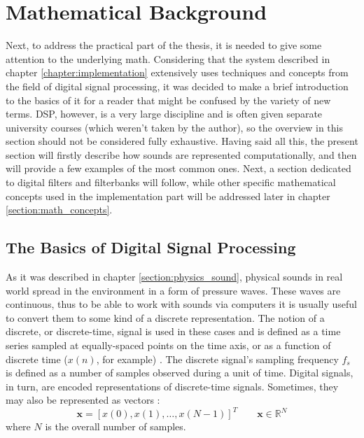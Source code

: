 \section{Mathematical Background}\label{chapter:math}

Next, to address the practical part of the thesis, it is needed to give some attention to the underlying math. Considering that the system described in chapter \ref{chapter:implementation} extensively uses techniques and concepts from the field of digital signal processing, it was decided to make a brief introduction to the basics of it for a reader that might be confused by the variety of new terms. DSP, however, is a very large discipline and is often given separate university courses (which weren't taken by the author), so the overview in this section should not be considered fully exhaustive. Having said all this, the present section will firstly describe how sounds are represented computationally, and then will provide a few examples of the most common ones. Next, a section dedicated to digital filters and filterbanks will follow, while other specific mathematical concepts used in the implementation part will be addressed later in chapter \ref{section:math_concepts}.

\subsection{The Basics of Digital Signal Processing}\label{section:math_basics}

As it was described in chapter \ref{section:physics_sound}, physical sounds in real world spread in the environment in a form of pressure waves. These waves are continuous, thus to be able to work with sounds via computers it is usually useful to convert them to some kind of a discrete representation. The notion of a discrete, or discrete-time, signal is used in these cases and is defined as a time series sampled at equally-spaced points on the time axis, or as a function of discrete time ($x(n)$, for example) \cite{Shenoi2005}. The discrete signal's sampling frequency $f_s$ is defined as a number of samples observed during a unit of time. Digital signals, in turn, are encoded representations of discrete-time signals. Sometimes, they may also be represented as vectors \cite{Abood2020}: \begin{equation}
	\textbf{x} = [x(0), x(1), \dots{}, x(N - 1)]^T\qquad\textbf{x}\in\mathbb{R}^N
\end{equation}
where $N$ is the overall number of samples.\\


